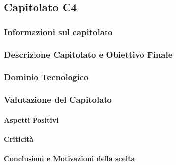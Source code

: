 \subsection{Capitolato C4}

\subsubsection{Informazioni sul capitolato}

\subsubsection{Descrizione Capitolato e Obiettivo Finale}

\subsubsection{Dominio Tecnologico}

\subsubsection{Valutazione del Capitolato}

\paragraph{Aspetti Positivi}

\paragraph{Criticità}

\paragraph{Conclusioni e Motivazioni della scelta}